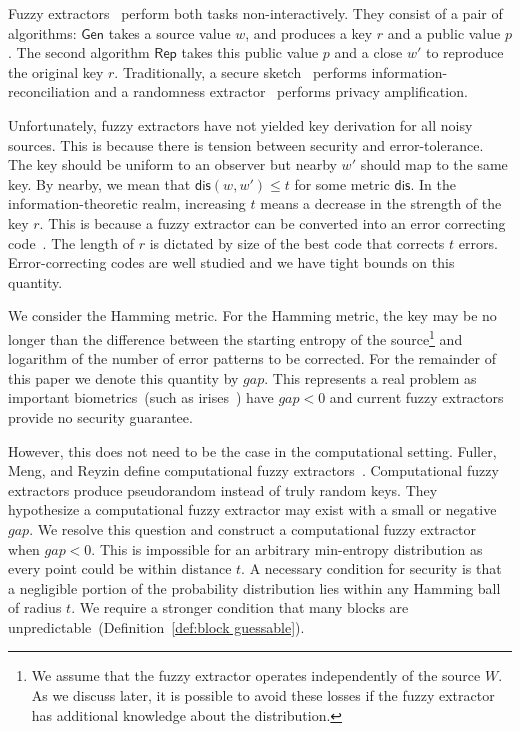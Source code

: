 \documentclass[11pt]{article}
\newcommand{\defref}[1]{\mbox{Definition~\ref{#1}}}
\newcommand{\class}[1]{{\ensuremath{\mathsf{#1}}}}
\newcommand{\gen}{\ensuremath{\class{Gen}}\xspace}
\newcommand{\rep}{\ensuremath{\class{Rep}}\xspace}
\newcommand{\dis}{\ensuremath{\mathsf{dis}}}
\newcommand{\Hoo}{\mathrm{H}_\infty}
\begin{document}
Fuzzy extractors~\cite{DBLP:journals/siamcomp/DodisORS08} perform both tasks non-interactively.  They consist of a pair of algorithms: \gen takes a source value $w$, and produces a key $r$ and a public value $p$.  The second algorithm \rep takes this public value $p$ and a close $w'$ to reproduce the original key $r$.  Traditionally, a secure sketch~\cite{DBLP:journals/siamcomp/DodisORS08} performs information-reconciliation and a randomness extractor~\cite{nisan1993randomness} performs privacy amplification.

Unfortunately, fuzzy extractors have not yielded key derivation for all noisy sources.  
This is because there is tension between security and error-tolerance.  The key should be uniform to an observer but nearby $w'$ should map to the same key.  By nearby, we mean that $\dis(w, w')\leq t$ for some metric $\dis$.  In the information-theoretic realm, increasing $t$ means a decrease in the strength of the key $r$.  This is because a fuzzy extractor can be converted into an error correcting code~\cite[Appendix C]{DBLP:journals/siamcomp/DodisORS08}.  The length of $r$ is dictated by size of the best code that corrects $t$ errors.  Error-correcting codes are well studied and we have tight bounds on this quantity. %

We consider the Hamming metric.  For the Hamming metric, the key may be no longer than the difference between the starting entropy of the source\footnote{We assume that the fuzzy extractor operates independently of the source $W$.  As we discuss later, it is possible to avoid these losses if the fuzzy extractor has additional knowledge about the distribution.} and logarithm of the number of error patterns to be corrected. For the remainder of this paper we denote this quantity by $gap$.  This represents a real problem as important biometrics~(such as irises~\cite{daugman2004}) have $gap <0$ and current fuzzy extractors provide no security guarantee.
 

However, this does not need to be the case in the computational setting.  Fuller, Meng, and Reyzin define computational fuzzy extractors~\cite{fuller2013computational}.  Computational fuzzy extractors produce pseudorandom instead of truly random keys.  They hypothesize a computational fuzzy extractor may exist with a small or negative $gap$.  We resolve this question and construct a computational fuzzy extractor when $gap<0$.  This is impossible for an arbitrary min-entropy distribution as every point could be within distance $t$.  A necessary condition for security is that a negligible portion of the probability distribution lies within any Hamming ball of radius $t$.  We require a stronger condition that many blocks are unpredictable~(\defref{def:block guessable}).  
\end{document}
